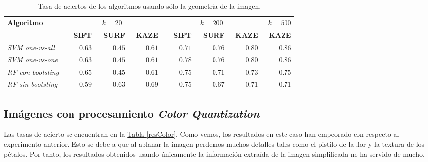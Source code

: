 \documentclass[paper=a4, fontsize=11pt]{article} %
\numberwithin{equation}{section} %
\numberwithin{figure}{section} %
\numberwithin{table}{section} %
\begin{document}
\begin{table}[H]
  \begin{tabular}{|l|r|r|r||r|r|r|r|}
  \hline
    \multirow{2}{*}{\textbf{Algoritmo}} & \multicolumn{3}{c||}{$k=20$} & \multicolumn{3}{c|}{$k=200$} & \textbf{$k=500$} \\
    \cline{2-8}
    & \textbf{SIFT} & \textbf{SURF} & \textbf{KAZE} & \textbf{SIFT} & \textbf{SURF} & \textbf{KAZE} & \textbf{KAZE} \\
    \hline
    \textit{SVM one-vs-all} & $\qquad 0.63$ & $\qquad 0.45$ & $\qquad 0.61$ & $\qquad 0.71$ & $\qquad 0.76$ & $\qquad 0.80$ & $\qquad 0.86$ \\ 
    \textit{SVM one-vs-one} & $\qquad 0.63$ & $\qquad 0.45$ & $\qquad 0.61$ & $\qquad 0.78$ & $\qquad 0.76$ & $\qquad 0.80$ & $\qquad 0.86$ \\
    \textit{RF con bootsting} & $\qquad 0.65$ & $\qquad 0.45$ & $\qquad 0.61$ & $\qquad 0.75$ & $\qquad 0.71$ & $\qquad 0.73$ & $\qquad 0.75$ \\
    \textit{RF sin bootsting} & $\qquad 0.59$ & $\qquad 0.63$ & $\qquad 0.69$ & $\qquad 0.75$ & $\qquad 0.67$ & $\qquad 0.71$ & $\qquad 0.71$ \\
    \hline
  \end{tabular}
  \label{resSHAPE}
  \caption{Tasa de aciertos de los algoritmos usando sólo la geometría de la imagen.}
\end{table}

\subsection{Imágenes con procesamiento \textit{Color Quantization}}

Las tasas de acierto se encuentran en la \hyperref[resColor]{Tabla \ref*{resColor}}. Como vemos, los resultados en este caso han empeorado con respecto al experimento anterior. Esto se debe a que al aplanar la imagen perdemos muchos detalles tales como el pistilo de la flor y la textura de los pétalos.  Por tanto, los resultados obtenidos usando únicamente la información extraída de la imagen simplificada no ha servido de mucho.
\end{document}
